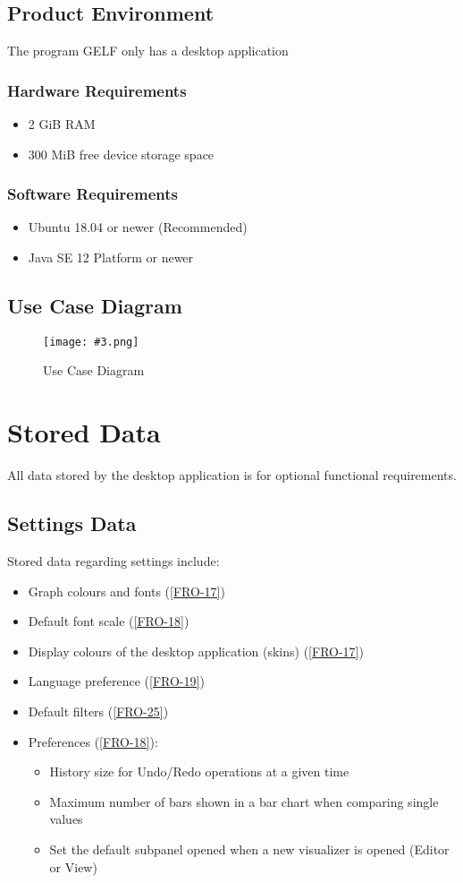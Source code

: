 \documentclass[10pt,a4paper]{report}
\newcommand{\includeimage}[5]{
    \begin{figure}[H]
        #1
        \texttt{[image: \#3.png]}
        \caption{#4}
        \label{fig:#5}
    \end{figure}
}
\begin{document}
\section{Product Environment}
The program GELF only has a desktop application
\subsection{Hardware Requirements}
\begin{itemize}
    \item 2 GiB RAM
    \item 300 MiB free device storage space
\end{itemize}
\subsection{Software Requirements}
\begin{itemize}
    \item Ubuntu 18.04 or newer (Recommended)
    \item Java SE 12 Platform or newer
\end{itemize}

\section{Use Case Diagram}
\includeimage{}{0.25}{Use Case}{Use Case Diagram}{}

\chapter{Stored Data}
All data stored by the desktop application is for optional functional requirements.

\section{Settings Data}

Stored data regarding settings include:

\begin{itemize}
    \item Graph colours and fonts (\ref{FRO-17})
    \item Default font scale (\ref{FRO-18})
    \item Display colours of the desktop application (skins) (\ref{FRO-17})
    \item Language preference (\ref{FRO-19})
    \item Default filters (\ref{FRO-25})
    \item Preferences (\ref{FRO-18}):
        \begin{itemize}
            \item History size for Undo/Redo operations at a given time
            \item Maximum number of bars shown in a bar chart when comparing single values
            \item Set the default subpanel opened when a new visualizer is opened (Editor or View)
        \end{itemize}
\end{itemize}
\end{document}
